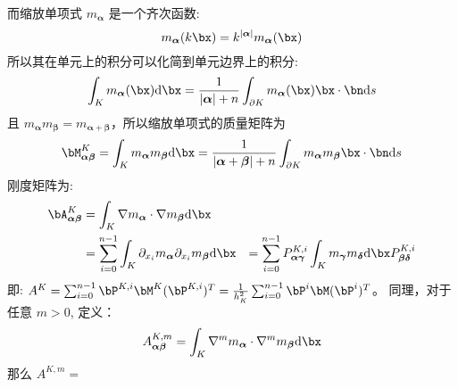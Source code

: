 而缩放单项式 $m_{\boldsymbol{\alpha}}$
是一个齐次函数:
$$
m_{\boldsymbol{\alpha}}(k\bx) = k^{|\boldsymbol{\alpha}|}
m_{\boldsymbol{\alpha}}(\bx)
$$
所以其在单元上的积分可以化简到单元边界上的积分:
$$
\int_K m_{\boldsymbol{\alpha}}(\bx)\mathrm{d}\bx =
\frac{1}{|\boldsymbol{\alpha}|+n} \int_{\partial K}
m_{\boldsymbol{\alpha}}(\bx)\bx\cdot \bn
\mathrm{d}s
$$
且 $m_{\boldsymbol{\alpha}}m_{\boldsymbol{\beta}} =
m_{\boldsymbol{\alpha+\beta}}$，所以缩放单项式的质量矩阵为
$$
\bM^{K}_{\boldsymbol{\alpha\beta}} = \int_K
m_{\boldsymbol{\alpha}}m_{\boldsymbol{\beta}}\mathrm{d}\bx =
\frac{1}{|\boldsymbol{\alpha}+\boldsymbol{\beta}|+n} \int_{\partial K}
m_{\boldsymbol{\alpha}}m_{\boldsymbol{\beta}}\bx\cdot \bn
\mathrm{d}s
$$
刚度矩阵为:
$$
\begin{aligned}
\bA^{K}_{\boldsymbol{\alpha\beta}} & = \int_K
\nabla m_{\boldsymbol{\alpha}}\cdot \nabla
m_{\boldsymbol{\beta}}\mathrm{d}\bx\\
& = 
\sum_{i=0}^{n-1} \int_K \partial_{x_i} m_{\boldsymbol{\alpha}}
\partial_{x_i} m_{\boldsymbol{\beta}}\mathrm{d}\bx
& = \sum_{i=0}^{n-1} P^{K, i}_{\boldsymbol{\alpha\gamma}}
\int_K m_{\boldsymbol{\gamma}}m_{\boldsymbol{\delta}}\mathrm{d}\bx
P^{K, i}_{\boldsymbol{\beta\delta}}
\end{aligned}
$$
即: $A^{K} = \sum_{i=0}^{n-1} \bP^{K, i}
\bM^{K} (\bP^{K, i})^T = \frac{1}{h_K^2}
\sum_{i=0}^{n-1} \bP^{i} \bM (\bP^{i})^T$。
同理，对于任意 $m>0$, 定义：
$$
A^{K, m}_{\boldsymbol{\alpha\beta}} = \int_K \nabla^m m_{\boldsymbol{\alpha}}
\cdot \nabla^m m_{\boldsymbol{\beta}}\mathrm{d}\bx
$$
那么 $A^{K, m} =$

